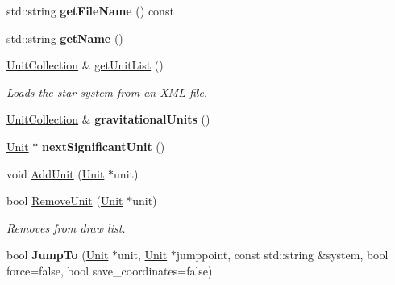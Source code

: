 \begin{DoxyCompactItemize}
\item 
std\+::string {\bfseries get\+File\+Name} () const \hypertarget{classStarSystem_a559dda34624fcc752edaf7a601468718}{}\label{classStarSystem_a559dda34624fcc752edaf7a601468718}

\item 
std\+::string {\bfseries get\+Name} ()\hypertarget{classStarSystem_a50c0c326aecf358adfc3d31525b8c522}{}\label{classStarSystem_a50c0c326aecf358adfc3d31525b8c522}

\item 
\hyperlink{classUnitCollection}{Unit\+Collection} \& \hyperlink{classStarSystem_aa8dd4a802628173d8b7d04d33f6fc7bc}{get\+Unit\+List} ()\hypertarget{classStarSystem_aa8dd4a802628173d8b7d04d33f6fc7bc}{}\label{classStarSystem_aa8dd4a802628173d8b7d04d33f6fc7bc}

\begin{DoxyCompactList}\small\item\em Loads the star system from an X\+ML file. \end{DoxyCompactList}\item 
\hyperlink{classUnitCollection}{Unit\+Collection} \& {\bfseries gravitational\+Units} ()\hypertarget{classStarSystem_a8c0a386d8b6cba71df30dcb8a8318e64}{}\label{classStarSystem_a8c0a386d8b6cba71df30dcb8a8318e64}

\item 
\hyperlink{classUnit}{Unit} $\ast$ {\bfseries next\+Significant\+Unit} ()\hypertarget{classStarSystem_a03463dd5ad775951f15c7774f8d26ad1}{}\label{classStarSystem_a03463dd5ad775951f15c7774f8d26ad1}

\item 
void \hyperlink{classStarSystem_acecee1515e867ce0afe0982e73144422}{Add\+Unit} (\hyperlink{classUnit}{Unit} $\ast$unit)
\item 
bool \hyperlink{classStarSystem_aaf122ac71cf8146b44cb10161687e8c6}{Remove\+Unit} (\hyperlink{classUnit}{Unit} $\ast$unit)\hypertarget{classStarSystem_aaf122ac71cf8146b44cb10161687e8c6}{}\label{classStarSystem_aaf122ac71cf8146b44cb10161687e8c6}

\begin{DoxyCompactList}\small\item\em Removes from draw list. \end{DoxyCompactList}\item 
bool {\bfseries Jump\+To} (\hyperlink{classUnit}{Unit} $\ast$unit, \hyperlink{classUnit}{Unit} $\ast$jumppoint, const std\+::string \&system, bool force=false, bool save\+\_\+coordinates=false)\hypertarget{classStarSystem_ab56fa12c03d545a09c45c07ae7c704de}{}\label{classStarSystem_ab56fa12c03d545a09c45c07ae7c704de}


\end{DoxyCompactItemize}
